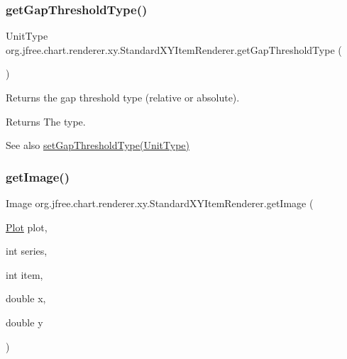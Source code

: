\subsubsection{\texorpdfstring{get\+Gap\+Threshold\+Type()}{getGapThresholdType()}}
{\footnotesize\ttfamily Unit\+Type org.\+jfree.\+chart.\+renderer.\+xy.\+Standard\+X\+Y\+Item\+Renderer.\+get\+Gap\+Threshold\+Type (\begin{DoxyParamCaption}{ }\end{DoxyParamCaption})}

Returns the gap threshold type (relative or absolute).

\begin{DoxyReturn}{Returns}
The type.
\end{DoxyReturn}
\begin{DoxySeeAlso}{See also}
\mbox{\hyperlink{classorg_1_1jfree_1_1chart_1_1renderer_1_1xy_1_1_standard_x_y_item_renderer_acddcdf4d9dc16b26b6d98f2f122229cd}{set\+Gap\+Threshold\+Type(\+Unit\+Type)}} 
\end{DoxySeeAlso}
\mbox{\label{classorg_1_1jfree_1_1chart_1_1renderer_1_1xy_1_1_standard_x_y_item_renderer_a7f5123b09b36d25b81349ed247b82162}} 
\subsubsection{\texorpdfstring{get\+Image()}{getImage()}}
{\footnotesize\ttfamily Image org.\+jfree.\+chart.\+renderer.\+xy.\+Standard\+X\+Y\+Item\+Renderer.\+get\+Image (\begin{DoxyParamCaption}\item[{\mbox{\hyperlink{classorg_1_1jfree_1_1chart_1_1plot_1_1_plot}{Plot}}}]{plot,  }\item[{int}]{series,  }\item[{int}]{item,  }\item[{double}]{x,  }\item[{double}]{y }\end{DoxyParamCaption})\hspace{0.3cm}{\ttfamily [protected]}}

